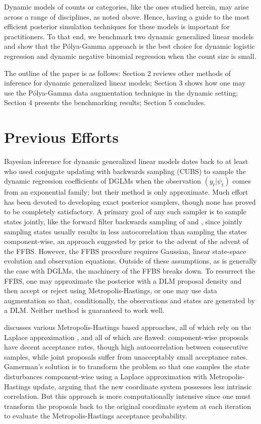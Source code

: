 \documentclass[12pt]{article}
\newcommand{\Polya}{P\'{o}lya}
\begin{document}
Dynamic models of counts or categories, like the ones studied herein, may arise
across a range of disciplines, as noted above.  Hence, having a guide to the
most efficient posterior simulation techniques for these models is important for
practitioners.  To that end, we benchmark two dynamic generalized linear models
and show that the \Polya-Gamma approach is the best choice for dynamic logistic
regression and dynamic negative binomial regression when the count size is
small.

The outline of the paper is as follows: Section 2 reviews other methods of
inference for dynamic generalized linear models; Section 3 shows how one may use
the \Polya-Gamma data augmentation technique in the dynamic setting; Section 4
presents the benchmarking results; Section 5 concludes.

\section{Previous Efforts}
\label{sec:previous-efforts}

Bayesian inference for dynamic generalized linear models dates back to at least
\cite{west-etal-1985} who used conjugate updating with backwards sampling (CUBS)
to sample the dynamic regression coefficients of DGLMs when the observation
$(y_t | \psi_t)$ comes from an exponential family; but their method is only
approximate.  Much effort has been devoted to developing exact posterior
samplers, though none has proved to be completely satisfactory.  A primary goal
of any such sampler is to sample states jointly, like the forward filter
backwards sampling of \cite{fruhwirth-schnatter-1994} and
\cite{carter-kohn-1994}, since jointly sampling states usually results in less
autocorrelation than sampling the states component-wise, an approach suggested
by \cite{carlin-etal-1992} prior to the advent of the advent of the FFBS.
However, the FFBS procedure requires Gaussian, linear state-space evolution and
observation equations.  Outside of these assumptions, as is generally the case
with DGLMs, the machinery of the FFBS breaks down.  To resurrect the FFBS, one
may approximate the posterior with a DLM proposal density and then accept or
reject using Metropolis-Hastings, or one may use data augmentation so that,
conditionally, the observations and states are generated by a DLM.  Neither
method is guaranteed to work well.

\cite{gamerman-1998} discusses various Metropolis-Hastings based approaches, all
of which rely on the Laplace approximation \citep{robert-casella-2005-book}, and
all of which are flawed: component-wise proposals have decent acceptance rates,
though high autocorrelation between consecutive samples, while joint proposals
suffer from unacceptably small acceptance rates.  Gamerman's solution is to
transform the problem so that one samples the state disturbances
component-wise using a Laplace approximation with Metropolis-Hastings update,
arguing that the new coordinate system possesses less intrinsic correlation.
But this approach is more computationally intensive since one must transform the
proposals back to the original coordinate system at each iteration to evaluate
the Metropolis-Hastings acceptance probability.
\end{document}

